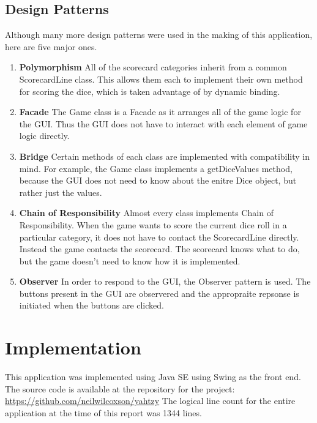 \documentclass[12pt]{article}
\begin{document}
\vspace*{.15in}
\subsection*{Design Patterns}
Although many more design patterns were used in the making of this application, here are five major ones.

\begin{enumerate}
\item \textbf{Polymorphism} \newline
All of the scorecard categories inherit from a common ScorecardLine class.  This allows them each to implement their own method for scoring the dice, which is taken advantage of by dynamic binding.
\item \textbf{Facade}\newline
The Game class is a Facade as it arranges all of the game logic for the GUI.  Thus the GUI does not have to interact with each element of game logic directly.

\newpage

\item \textbf{Bridge}\newline
Certain methods of each class are implemented with compatibility in mind.  For example, the Game class implements a getDiceValues method, because the GUI does not need to know about the enitre Dice object, but rather just the values.

\item \textbf{Chain of Responsibility}\newline
Almost every class implements Chain of Responsibility.  When the game wants to score the current dice roll in a particular category, it does not have to contact the ScorecardLine directly.  Instead the game contacts the scorecard.  The scorecard knows what to do, but the game doesn't need to know how it is implemented.
\item \textbf{Observer}\newline
In order to respond to the GUI, the Observer pattern is used.  The buttons present in the GUI are observered and the appropraite repsonse is initiated when the buttons are clicked.
\end{enumerate}

\section*{Implementation}
This application was implemented using Java SE using Swing as the front end.  The source code is available at the repository for the project:\newline
\url{https://github.com/neilwilcoxson/yahtzy}\newline\newline
\noindent The logical line count for the entire application at the time of this report was 1344 lines.
\end{document}
